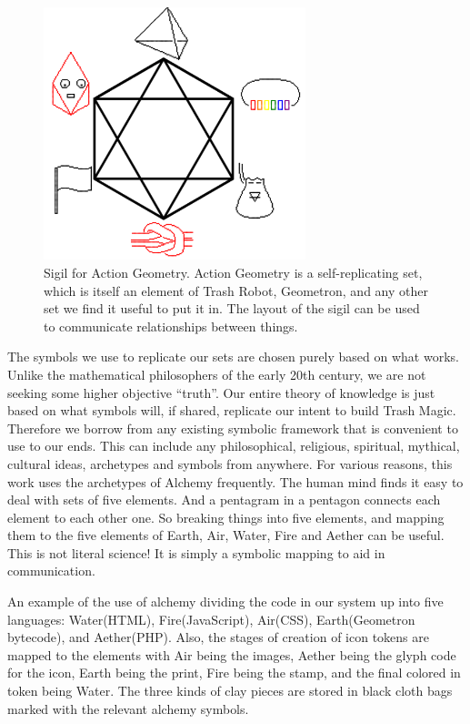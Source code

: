 \begin{figure}
	\centering
	\includegraphics[width=3in]{figures/magic/actiongeometrysigil.png}
	\caption[actiongeometrysigil]
	{Sigil for Action Geometry.  Action Geometry is a self-replicating set, which is itself an element of Trash Robot, Geometron, and any other set we find it useful to put it in.  The layout of the sigil can be used to communicate relationships between things.}
\end{figure}


The symbols we use to replicate our sets are chosen purely based on what works.  Unlike the mathematical philosophers of the early 20th century, we are not seeking some higher objective ``truth''.  Our entire theory of knowledge is just based on what symbols will, if shared, replicate our intent to build Trash Magic.  Therefore we borrow from any existing symbolic framework that is convenient to use to our ends.  This can include any philosophical, religious, spiritual, mythical, cultural ideas, archetypes and symbols from anywhere.  For various reasons, this work uses the archetypes of Alchemy frequently.  The human mind finds it easy to deal with sets of five elements. And a pentagram in a pentagon connects each element to each other one.  So breaking things into five elements, and mapping them to the five elements of Earth, Air, Water, Fire and Aether can be useful.  This is not literal science! It is simply a symbolic mapping to aid in communication.  

An example of the use of alchemy dividing the code in our system up into five languages: Water(HTML), Fire(JavaScript), Air(CSS), Earth(Geometron bytecode), and Aether(PHP).  Also, the stages of creation of icon tokens are mapped to the elements with Air being the images, Aether being the glyph code for the icon, Earth being the print, Fire being the stamp, and the final colored in token being Water.  The three kinds of clay pieces are stored in black cloth bags marked with the relevant alchemy symbols.


